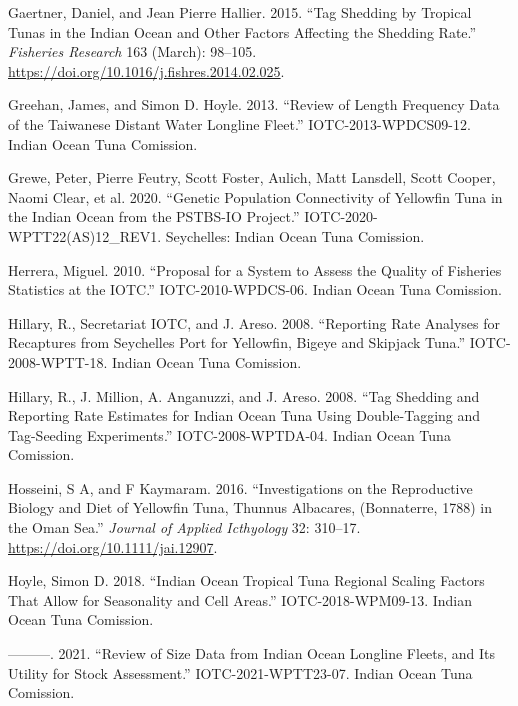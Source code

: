 \documentclass[
]{scrartcl}
\newlength{\cslhangindent}
\newenvironment{CSLReferences}[2] %
 {\begin{list}{}{%
  \setlength{\itemindent}{0pt}
  \setlength{\leftmargin}{0pt}
  \setlength{\parsep}{0pt}
  \ifodd #1
   \setlength{\leftmargin}{\cslhangindent}
   \setlength{\itemindent}{-1\cslhangindent}
  \fi
  \setlength{\itemsep}{#2\baselineskip}}}
 {\end{list}}
\begin{document}
\begin{CSLReferences}{1}{0}
Gaertner, Daniel, and Jean Pierre Hallier. 2015. {``Tag Shedding by
Tropical Tunas in the {Indian Ocean} and Other Factors Affecting the
Shedding Rate.''} \emph{Fisheries Research} 163 (March): 98--105.
\url{https://doi.org/10.1016/j.fishres.2014.02.025}.

Greehan, James, and Simon D. Hoyle. 2013. {``Review of Length Frequency
Data of the {Taiwanese Distant Water Longline Fleet}.''}
IOTC-2013-WPDCS09-12. Indian Ocean Tuna Comission.

Grewe, Peter, Pierre Feutry, Scott Foster, Aulich, Matt Lansdell, Scott
Cooper, Naomi Clear, et al. 2020. {``Genetic Population Connectivity of
Yellowfin Tuna in the {Indian Ocean} from the {PSTBS-IO Project}.''}
IOTC-2020-WPTT22(AS)12\_REV1. Seychelles: Indian Ocean Tuna Comission.

Herrera, Miguel. 2010. {``Proposal for a System to Assess the Quality of
Fisheries Statistics at the {IOTC}.''} IOTC-2010-WPDCS-06. Indian Ocean
Tuna Comission.

Hillary, R., Secretariat IOTC, and J. Areso. 2008. {``Reporting Rate
Analyses for Recaptures from {Seychelles} Port for Yellowfin, Bigeye and
Skipjack Tuna.''} IOTC-2008-WPTT-18. Indian Ocean Tuna Comission.

Hillary, R., J. Million, A. Anganuzzi, and J. Areso. 2008. {``Tag
Shedding and Reporting Rate Estimates for {Indian Ocean} Tuna Using
Double-Tagging and Tag-Seeding Experiments.''} IOTC-2008-WPTDA-04.
Indian Ocean Tuna Comission.

Hosseini, S A, and F Kaymaram. 2016. {``Investigations on the
Reproductive Biology and Diet of Yellowfin Tuna, {Thunnus} Albacares,
({Bonnaterre}, 1788) in the {Oman Sea}.''} \emph{Journal of Applied
Icthyology} 32: 310--17. \url{https://doi.org/10.1111/jai.12907}.

Hoyle, Simon D. 2018. {``Indian {Ocean} Tropical Tuna Regional Scaling
Factors That Allow for Seasonality and Cell Areas.''}
IOTC-2018-WPM09-13. Indian Ocean Tuna Comission.

---------. 2021. {``Review of Size Data from {Indian Ocean} Longline
Fleets, and Its Utility for Stock Assessment.''} IOTC-2021-WPTT23-07.
Indian Ocean Tuna Comission.


\end{CSLReferences}
\end{document}
